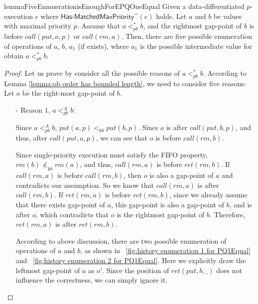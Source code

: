 \begin{restatable}{lemma}{FiveEnmuerationisEnoughForEPQOneEqual}
\label{lemma:five enumeration is enough for EPQ1Equal}
Given a data-differentiated $p$-execution $e$ where $\mathsf{Has\text{-}MatchedMaxPriority}^{=}(e)$ holds. Let $a$ and $b$ be values with maximal priority $p$. Assume that $a <_{\textit{pb}}^* b$, and the rightmost gap-point of $b$ is before $\textit{call}(\textit{put},a,p)$ or $\textit{call}(\textit{rm},a)$. Then, there are five possible enumeration of operations of $a$, $b$, $a_1$ (if exists), where $a_1$ is the possible intermediate value for obtain $a <_{\textit{pb}}^* b$.
\end{restatable}
\begin {proof}

Let us prove by consider all the possible reasons of $a <_{\textit{pb}}^* b$. According to Lemma \ref{lemma:ob order has bounded length}, we need to consider five reasons: Let $o$ be the right-most gap-point of $b$.

\begin{itemize}
\setlength{\itemsep}{0.5pt}
\item[-] Reason $1$, $a <_{\textit{pb}}^A b$:

    Since $a <_{\textit{pb}}^A b$, $\textit{put}(a,p) <_{\textit{hb}} \textit{put}(b,p)$. Since $o$ is after $\textit{call}(\textit{put},b,p)$, and thus, after $\textit{call}(\textit{put},a,p)$, we can see that $o$ is before $\textit{call}(\textit{rm},b)$.

    Since single-priority execution must satisfy the FIFO property, $\textit{rm}(b) \not <_{\textit{hb}} \textit{rm}(a)$, and thus, $\textit{call}(\textit{rm},a)$ is before $\textit{ret}(\textit{rm},b)$. If $\textit{call}(\textit{rm},a)$ is before $\textit{call}(\textit{rm},b)$, then $o$ is also a gap-point of $a$ and contradicts our assumption. So we know that $\textit{call}(\textit{rm},a)$ is after $\textit{call}(\textit{rm},b)$. If $\textit{ret}(\textit{rm},a)$ is before $\textit{ret}(\textit{rm},b)$, since we already assume that there exists gap-point of $a$, this gap-point is also a gap-point of $b$, and is after $o$, which contradicts that $o$ is the rightmost gap-point of $b$. Therefore, $\textit{ret}(\textit{rm},a)$ is after $\textit{ret}(\textit{rm},b)$.

    According to above discussion, there are two possible enumeration of operations of $a$ and $b$, as shown in \figurename~\ref{fig:history enumeration 1 for PQ1Equal} and \figurename~\ref{fig:history enumeration 2 for PQ1Equal}. Here we explicitly draw the leftmost gap-point of $a$ as $o'$. Since the position of $\textit{ret}(\textit{put},b,\_)$ does not influence the correctness, we can simply ignore it.


\end{itemize}
\end{proof}
